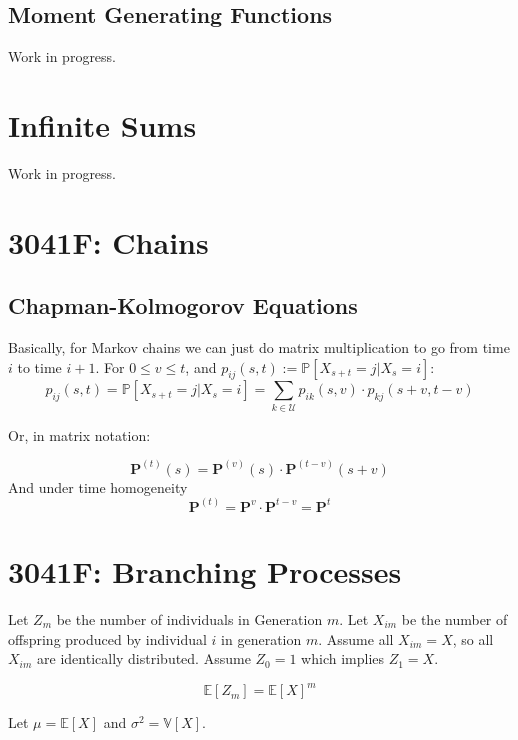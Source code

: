\documentclass[12pt]{article}
\begin{document}
    \subsection{Moment Generating Functions}
    Work in progress.
\section{Infinite Sums}
Work in progress.
\section{3041F: Chains}
    \subsection{Chapman-Kolmogorov Equations}
    Basically, for Markov chains we can just do matrix multiplication to go from time \(i\) to time \(i + 1\).
    For \(0 \le v \le t\), and \(p_{ij}(s, t) := \mathbb{P}[X_{s+t} = j | X_s = i]\):
    \begin{equation*}
        p_{ij}(s, t) = \mathbb{P}[X_{s+t} = j | X_s = i] = 
        \sum_{k \in \mathcal{U}}p_{ik}(s, v) \cdot p_{kj}(s + v, t - v)
    \end{equation*}

    Or, in matrix notation:

    \begin{equation*}
        \mathbf{P}^{(t)}(s) = \mathbf{P}^{(v)}(s) \cdot \mathbf{P}^{(t-v)}(s + v)
    \end{equation*}
    And under time homogeneity
    \begin{equation*}
        \mathbf{P}^{(t)} = \mathbf{P}^{v} \cdot \mathbf{P}^{t-v} = \mathbf{P}^{t} 
    \end{equation*}
\section{3041F: Branching Processes}
    Let \(Z_m\) be the number of individuals in Generation \(m\).
    Let \(X_{im}\) be the number of offspring produced by individual \(i\) in generation \(m\).
    Assume all \(X_{im} = X\), so all \(X_{im}\) are identically distributed.
    Assume \(Z_0 = 1\) which implies \(Z_1 = X\).

    \begin{equation*}
        \mathbb{E}[Z_m] = \mathbb{E}[X]^m
    \end{equation*}

    Let \(\mu =\mathbb{E}[X]\) and \(\sigma^2 = \mathbb{V}[X]\).
\end{document}
